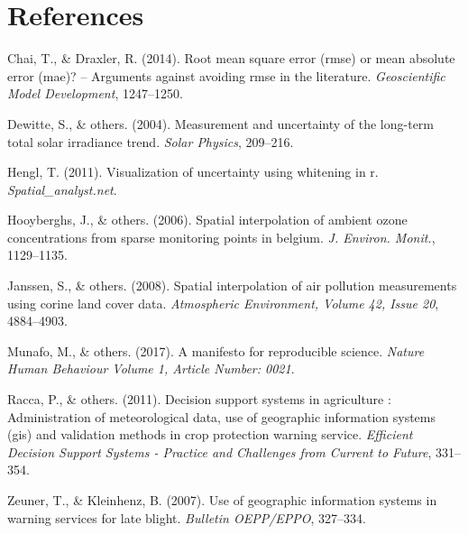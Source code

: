 \documentclass[12pt,twoside]{reedthesis}
\theoremstyle{definition}
\theoremstyle{definition}
\theoremstyle{definition}
\theoremstyle{remark}
\begin{document}
\chapter*{References}\label{references}


\noindent

\setlength{\parindent}{-0.20in} \setlength{\leftskip}{0.20in}
\setlength{\parskip}{8pt}

\hypertarget{refs}{}
\hypertarget{ref-chai2014}{}
Chai, T., \& Draxler, R. (2014). Root mean square error (rmse) or mean
absolute error (mae)? -- Arguments against avoiding rmse in the
literature. \emph{Geoscientific Model Development}, 1247--1250.

\hypertarget{ref-dewitte2004}{}
Dewitte, S., \& others. (2004). Measurement and uncertainty of the
long-term total solar irradiance trend. \emph{Solar Physics}, 209--216.

\hypertarget{ref-hengl2011}{}
Hengl, T. (2011). Visualization of uncertainty using whitening in r.
\emph{Spatial\_analyst.net}.

\hypertarget{ref-hooyberghs2006}{}
Hooyberghs, J., \& others. (2006). Spatial interpolation of ambient
ozone concentrations from sparse monitoring points in belgium. \emph{J.
Environ. Monit.}, 1129--1135.

\hypertarget{ref-janssen2008}{}
Janssen, S., \& others. (2008). Spatial interpolation of air pollution
measurements using corine land cover data. \emph{Atmospheric
Environment, Volume 42, Issue 20}, 4884--4903.

\hypertarget{ref-munafo2017}{}
Munafo, M., \& others. (2017). A manifesto for reproducible science.
\emph{Nature Human Behaviour Volume 1, Article Number: 0021}.

\hypertarget{ref-racca2011}{}
Racca, P., \& others. (2011). Decision support systems in agriculture :
Administration of meteorological data, use of geographic information
systems (gis) and validation methods in crop protection warning service.
\emph{Efficient Decision Support Systems - Practice and Challenges from
Current to Future}, 331--354.

\hypertarget{ref-zeuner2007}{}
Zeuner, T., \& Kleinhenz, B. (2007). Use of geographic information
systems in warning services for late blight. \emph{Bulletin OEPP/EPPO},
327--334.

\end{document}
